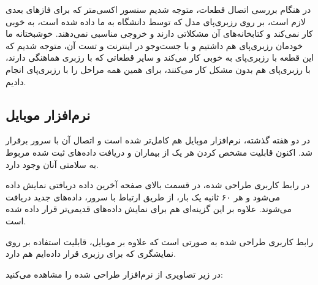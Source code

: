 \documentclass[12pt]{article}
\begin{document}
در هنگام بررسی اتصال قطعات، متوجه شدیم سنسور اکسی‌متر که برای فازهای بعدی لازم است، بر روی رزبری‌پای مدل  که توسط دانشگاه به ما داده شده است، به خوبی کار نمی‌کند و کتابخانه‌های آن مشکلاتی دارند و خروجی مناسبی نمی‌دهند. خوشبختانه ما خودمان رزبری‌پای  هم داشتیم و با جست‌وجو در اینترنت و تست آن، متوجه شدیم که این قطعه با رزبری‌پای  به خوبی کار می‌کند و سایر قطعاتی که با رزبری  هماهنگی دارند، با رزبری‌پای  هم بدون مشکل کار می‌کنند، برای همین همه مراحل را با رزبری‌پای  انجام دادیم.

\subsection{نرم‌افزار موبایل}

در دو هفته گذشته، نرم‌افزار موبایل هم کامل‌تر شده است و اتصال آن با سرور برقرار شد. اکنون قابلیت مشخص کردن هر یک از بیماران و دریافت داده‌های ثبت شده مربوط به سلامتی آنان وجود دارد.

در رابط کاربری طراحی شده، در قسمت بالای صفحه آخرین داده دریافتی نمایش داده می‌شود و هر ۶۰ ثانیه یک بار، از طریق ارتباط با سرور، داده‌های جدید دریافت می‌شوند. علاوه بر این گزینه‌ای هم برای نمایش داده‌های قدیمی‌تر قرار داده شده است.

رابط کاربری طراحی شده به صورتی است که علاوه بر موبایل، قابلیت استفاده بر روی نمایشگری که برای رزبری قرار داده‌ایم هم دارد.

در زیر تصاویری از نرم‌افزار طراحی شده را مشاهده می‌کنید:
\end{document}
